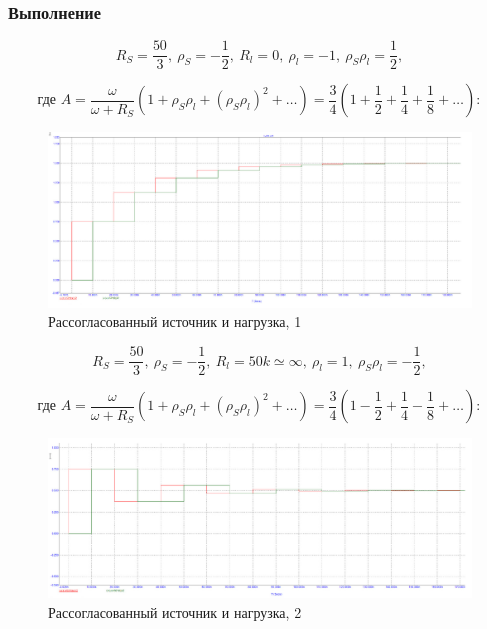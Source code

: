 \documentclass[a4paper, 14pt]{extarticle}%
\begin{document}
\subsubsection{Выполнение}

\[R_{S}=\frac{50}{3},\ \rho_{S}=-\frac{1}{2},\  R_{l}=0,\ \rho_{l}=-1,\ \rho_{S} \rho_{l}=\frac{1}{2},\]

\[ \text{где }A=\frac{\omega}{\omega+R_{S}}\left(1+\rho_{S} \rho_{l}+\left(\rho_{S} \rho_{l}\right)^{2}+\ldots\right)=\frac{3}{4}\left(1+\frac{1}{2}+\frac{1}{4}+\frac{1}{8}+\ldots\right) :\]

\newpage

\begin{figure}[h!]
			\centering
			\includegraphics[width=1.1\linewidth]{./graphs/14.jpg}
			\caption{Рассогласованный источник и нагрузка, 1}
			\label{4.1}
\end{figure}

\[R_{S}=\frac{50}{3},\ \rho_{S}=-\frac{1}{2},\  R_{l}=50k \simeq \infty,\ \rho_{l}=1,\ \rho_{S} \rho_{l}=-\frac{1}{2},\]

\[ \text{где }A=\frac{\omega}{\omega+R_{S}}\left(1+\rho_{S} \rho_{l}+\left(\rho_{S} \rho_{l}\right)^{2}+\ldots\right)=\frac{3}{4}\left(1-\frac{1}{2}+\frac{1}{4}-\frac{1}{8}+\ldots\right) :\]

\begin{figure}[h!]
			\centering
			\includegraphics[width=1.1\linewidth]{./graphs/15.jpg}
			\caption{Рассогласованный источник и нагрузка, 2}
			\label{4.2}
\end{figure}
\end{document}
